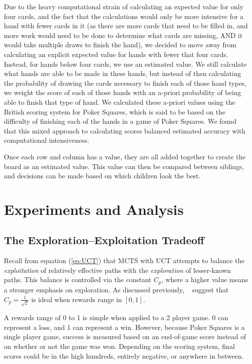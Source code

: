 \documentclass[letterpaper]{article}
\begin{document}
Due to the heavy computational strain of calculating an expected value for only four cards, and the fact that the calculations would only be more intensive for a hand with fewer cards in it (as there are more cards that need to be filled in, and more work would need to be done to determine what cards are missing, AND it would take multiple draws to finish the hand), we decided to move away from calculating an explicit expected value for hands with fewer that four cards. Instead, for hands below four cards, we use an estimated value. We still calculate what hands are able to be made in these hands, but instead of then calculating the probability of drawing the cards necessary to finish each of those hand types, we weight the score of each of those hands with an a-priori probability of being able to finish that type of hand. We calculated these a-priori values using the British scoring system for Poker Squares, which is said to be based on the difficulty of finishing each of the hands in a game of Poker Squares. We found that this mixed approach to calculating scores balanced estimated accuracy with computational intensiveness.

Once each row and column has a value, they are all added together to create the board as an estimated value. This value can then be compared between siblings, and decisions can be made based on which children look the best. 

\section{Experiments and Analysis}

\subsection{The Exploration--Exploitation Tradeoff}
Recall from equation (\ref{eq:UCT}) that MCTS with UCT attempts to balance the {\it exploitation} of relatively effective paths with the {\it exploration} of lesser-known paths. This balance is controlled via the constant $C_p$, where a higher value means a stronger emphasis on exploration. As discussed previously, ~\cite{kocsis2006improved} suggest that $C_p = \frac{1}{\sqrt{2}}$ is ideal when rewards range in $[0,1]$. 

A rewards range of 0 to 1 is simple when applied to a 2 player game. 0 can represent a loss, and 1 can represent a win. However, because Poker Squares is a single player game, success is measured based on an end-of-game score instead of on whether or not the game was won. Depending on the scoring system, final scores could be in the high hundreds, entirely negative, or anywhere in between. 
\end{document}
